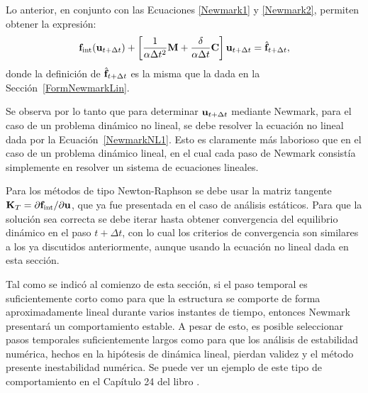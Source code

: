 Lo anterior, en conjunto con las Ecuaciones \eqref{Newmark1} y \eqref{Newmark2}, permiten obtener la expresión:
%
\begin{equation}\label{NewmarkNL1}
{\bf f}_{\text{int}}({\bf u}_{t+\Delta t})+\left[ \frac{1}{\alpha \Delta t^2} {\bf M} + \frac{\delta}{\alpha \Delta t} {\bf C} \right] {\bf u}_{t+\Delta t} = \hat{{\bf f}}_{t+\Delta t},
\end{equation}
%
donde la definición de $\hat{{\bf f}}_{t+\Delta t}$ es la misma que la dada en la Sección~\ref{FormNewmarkLin}. %

Se observa por lo tanto que para determinar ${\bf u}_{t+\Delta t}$ mediante Newmark, para el caso de un problema dinámico no lineal, se debe resolver la ecuación no lineal dada por la Ecuación~\eqref{NewmarkNL1}. %
%
Esto es claramente más laborioso que en el caso de un problema dinámico lineal, en el cual cada paso de Newmark consistía simplemente en resolver un sistema de ecuaciones lineales.


Para los métodos de tipo Newton-Raphson se debe usar la matriz tangente ${\bf K}_T = \partial {\bf f}_{\text{int}} / \partial {\bf u}$, que ya fue presentada en el caso de análisis estáticos. %
%
Para que la solución sea correcta se debe iterar hasta obtener convergencia del equilibrio dinámico en el paso $t+\Delta t$, con lo cual los criterios de convergencia son similares a los ya discutidos anteriormente, aunque usando la ecuación no lineal dada en esta sección.

Tal como se indicó al comienzo de esta sección, si el paso temporal es suficientemente corto como para que la estructura se comporte de forma aproximadamente lineal durante varios instantes de tiempo, entonces Newmark presentará un comportamiento estable. A pesar de esto, es posible seleccionar pasos temporales suficientemente largos como para que los análisis de estabilidad numérica, hechos en la hipótesis de dinámica lineal, pierdan validez y el método presente inestabilidad numérica. %
%
Se puede ver un ejemplo de este tipo de comportamiento en el Capítulo 24 del libro \citep{Crisfield1997}.

